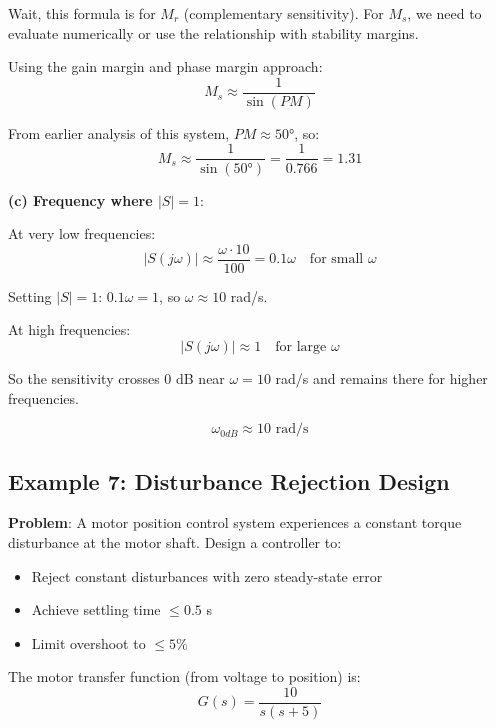 Wait, this formula is for $M_r$ (complementary sensitivity). For $M_s$, we need to evaluate numerically or use the relationship with stability margins.

Using the gain margin and phase margin approach:
\begin{equation}
    M_s \approx \frac{1}{\sin(PM)}
\end{equation}

From earlier analysis of this system, $PM \approx 50°$, so:
\begin{equation}
    M_s \approx \frac{1}{\sin(50°)} = \frac{1}{0.766} = \boxed{1.31}
\end{equation}

\textbf{(c) Frequency where $|S| = 1$}:

At very low frequencies:
\begin{equation}
    |S(j\omega)| \approx \frac{\omega \cdot 10}{100} = 0.1\omega \quad \text{for small } \omega
\end{equation}

Setting $|S| = 1$: $0.1\omega = 1$, so $\omega \approx 10$ rad/s.

At high frequencies:
\begin{equation}
    |S(j\omega)| \approx 1 \quad \text{for large } \omega
\end{equation}

So the sensitivity crosses 0 dB near $\omega = 10$ rad/s and remains there for higher frequencies.

\begin{equation}
    \boxed{\omega_{0dB} \approx 10 \text{ rad/s}}
\end{equation}

\subsection{Example 7: Disturbance Rejection Design}

\textbf{Problem}: A motor position control system experiences a constant torque disturbance at the motor shaft. Design a controller to:
\begin{itemize}
    \item Reject constant disturbances with zero steady-state error
    \item Achieve settling time $\leq 0.5$ s
    \item Limit overshoot to $\leq 5\%$
\end{itemize}

The motor transfer function (from voltage to position) is:
\begin{equation}
    G(s) = \frac{10}{s(s+5)}
\end{equation}

